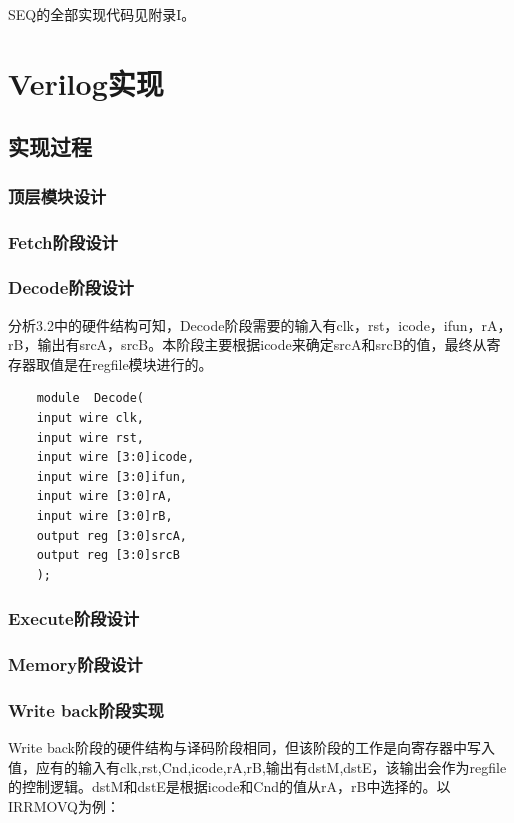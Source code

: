 \documentclass[a4paper,12pt]{report}
\begin{document}
SEQ的全部实现代码见附录I。


\chapter{Verilog实现}
\begin{spacing}{1.5}
	
\section{实现过程}

\subsection{顶层模块设计}
	

\subsection{Fetch阶段设计}
	
\subsection{Decode阶段设计}
	分析3.2中的硬件结构可知，Decode阶段需要的输入有clk，rst，icode，ifun，rA，rB，输出有srcA，srcB。本阶段主要根据icode来确定srcA和srcB的值，最终从寄存器取值是在regfile模块进行的。
	\begin{lstlisting}
	module	Decode(
	input wire clk,
	input wire rst,
	input wire [3:0]icode,
	input wire [3:0]ifun,
	input wire [3:0]rA,
	input wire [3:0]rB,
	output reg [3:0]srcA,
	output reg [3:0]srcB
	);
	\end{lstlisting}
	

\subsection{Execute阶段设计}
	

\subsection{Memory阶段设计}
	

\subsection{Write back阶段实现}
	Write back阶段的硬件结构与译码阶段相同，但该阶段的工作是向寄存器中写入值，应有的输入有clk,rst,Cnd,icode,rA,rB,输出有dstM,dstE，该输出会作为regfile的控制逻辑。dstM和dstE是根据icode和Cnd的值从rA，rB中选择的。以IRRMOVQ为例：
	


\end{spacing}
\end{document}
